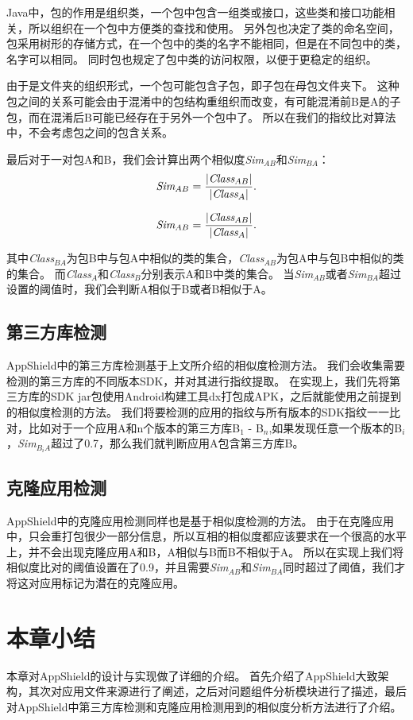 Java中，包的作用是组织类，一个包中包含一组类或接口，这些类和接口功能相关，所以组织在一个包中方便类的查找和使用。
另外包也决定了类的命名空间，包采用树形的存储方式，在一个包中的类的名字不能相同，但是在不同包中的类，名字可以相同。
同时包也规定了包中类的访问权限，以便于更稳定的组织。

由于是文件夹的组织形式，一个包可能包含子包，即子包在母包文件夹下。
这种包之间的关系可能会由于混淆中的包结构重组织而改变，有可能混淆前B是A的子包，而在混淆后B可能已经存在于另外一个包中了。
所以在我们的指纹比对算法中，不会考虑包之间的包含关系。


最后对于一对包A和B，我们会计算出两个相似度\emph{Sim$_{AB}$}和\emph{Sim$_{BA}$}：
\begin{equation}
	\emph{Sim$_{AB}$} = \frac{|\emph{Class$_{AB}$}|}{|\emph{Class$_{A}$}|}.
\end{equation}

\begin{equation}
	\emph{Sim$_{AB}$} = \frac{|\emph{Class$_{AB}$}|}{|\emph{Class$_{A}$}|}.
\end{equation}

其中\emph{Class$_{BA}$}为包B中与包A中相似的类的集合，\emph{Class$_{AB}$}为包A中与包B中相似的类的集合。
而\emph{Class$_{A}$}和\emph{Class$_{B}$}分别表示A和B中类的集合。
当\emph{Sim$_{AB}$}或者\emph{Sim$_{BA}$}超过设置的阈值时，我们会判断A相似于B或者B相似于A。

\subsection{第三方库检测}

AppShield中的第三方库检测基于上文所介绍的相似度检测方法。
我们会收集需要检测的第三方库的不同版本SDK，并对其进行指纹提取。
在实现上，我们先将第三方库的SDK jar包使用Android构建工具dx打包成APK，之后就能使用之前提到的相似度检测的方法。
我们将要检测的应用的指纹与所有版本的SDK指纹一一比对，比如对于一个应用A和n个版本的第三方库B$_{1}$ - B$_{n}$,如果发现任意一个版本的B$_{i}$，\emph{Sim$_{B_{i}A}$}超过了0.7，那么我们就判断应用A包含第三方库B。

\subsection{克隆应用检测}

AppShield中的克隆应用检测同样也是基于相似度检测的方法。
由于在克隆应用中，只会重打包很少一部分信息，所以互相的相似度都应该要求在一个很高的水平上，并不会出现克隆应用A和B，A相似与B而B不相似于A。
所以在实现上我们将相似度比对的阈值设置在了0.9，并且需要\emph{Sim$_{AB}$}和\emph{Sim$_{BA}$}同时超过了阈值，我们才将这对应用标记为潜在的克隆应用。

\section{本章小结}
\label{sec:appshield:conclusion}

本章对AppShield的设计与实现做了详细的介绍。
首先介绍了AppShield大致架构，其次对应用文件来源进行了阐述，之后对问题组件分析模块进行了描述，最后对AppShield中第三方库检测和克隆应用检测用到的相似度分析方法进行了介绍。